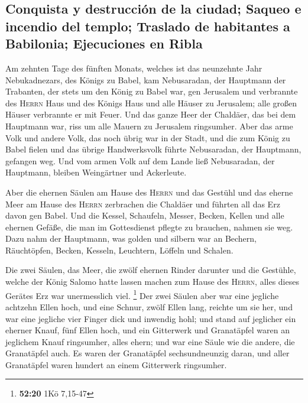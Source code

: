 \hypertarget{conquista-y-destrucciuxf3n-de-la-ciudad-saqueo-e-incendio-del-templo-traslado-de-habitantes-a-babilonia-ejecuciones-en-ribla}{%
\subsection{Conquista y destrucción de la ciudad; Saqueo e incendio del
templo; Traslado de habitantes a Babilonia; Ejecuciones en
Ribla}\label{conquista-y-destrucciuxf3n-de-la-ciudad-saqueo-e-incendio-del-templo-traslado-de-habitantes-a-babilonia-ejecuciones-en-ribla}}

 Am zehnten Tage des fünften Monats, welches ist das
neunzehnte Jahr Nebukadnezars, des Königs zu Babel, kam Nebusaradan, der
Hauptmann der Trabanten, der stets um den König zu Babel war, gen
Jerusalem  und verbrannte des \textsc{Herrn} Haus und des
Königs Haus und alle Häuser zu Jerusalem; alle großen Häuser verbrannte
er mit Feuer.  Und das ganze Heer der Chaldäer, das bei
dem Hauptmann war, riss um alle Mauern zu Jerusalem ringsumher.
 Aber das arme Volk und andere Volk, das noch übrig war
in der Stadt, und die zum König zu Babel fielen und das übrige
Handwerksvolk führte Nebusaradan, der Hauptmann, gefangen weg.
 Und vom armen Volk auf dem Lande ließ Nebusaradan, der
Hauptmann, bleiben Weingärtner und Ackerleute.

 Aber die ehernen Säulen am Hause des \textsc{Herrn} und
das Gestühl und das eherne Meer am Hause des \textsc{Herrn} zerbrachen
die Chaldäer und führten all das Erz davon gen Babel. 
Und die Kessel, Schaufeln, Messer, Becken, Kellen und alle ehernen
Gefäße, die man im Gottesdienst pflegte zu brauchen, nahmen sie weg.
 Dazu nahm der Hauptmann, was golden und silbern war an
Bechern, Räuchtöpfen, Becken, Kesseln, Leuchtern, Löffeln und Schalen.

 Die zwei Säulen, das Meer, die zwölf ehernen Rinder
darunter und die Gestühle, welche der König Salomo hatte lassen machen
zum Hause des \textsc{Herrn}, alles dieses Gerätes Erz war unermesslich
viel. \footnote{\textbf{52:20} 1Kö 7,15-47}  Der zwei
Säulen aber war eine jegliche achtzehn Ellen hoch, und eine Schnur,
zwölf Ellen lang, reichte um sie her, und war eine jegliche vier Finger
dick und inwendig hohl;  und stand auf jeglicher ein
eherner Knauf, fünf Ellen hoch, und ein Gitterwerk und Granatäpfel waren
an jeglichem Knauf ringsumher, alles ehern; und war eine Säule wie die
andere, die Granatäpfel auch.  Es waren der Granatäpfel
sechsundneunzig daran, und aller Granatäpfel waren hundert an einem
Gitterwerk ringsumher.

